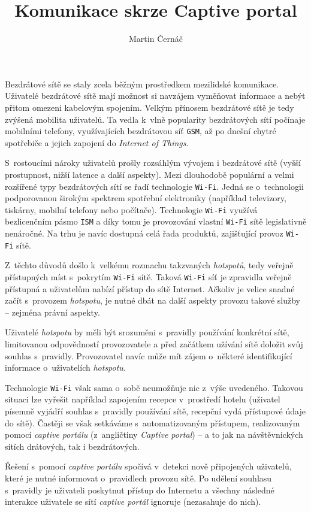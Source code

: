 \documentclass[thesis=M,czech]{FITthesis}[2012/10/20]
\title{Komunikace skrze Captive portal}
\author{Martin Černáč} %
\begin{document}
\begin{introduction}
Bezdrátové sítě se staly zcela běžným prostředkem mezilidské komunikace. Uživatelé bezdrátové sítě mají možnost si navzájem vyměňovat informace a nebýt přitom omezeni kabelovým spojením. Velkým přínosem bezdrátové sítě je tedy zvýšená mobilita uživatelů. Ta vedla k~vlně popularity bezdrátových sítí počínaje mobilními telefony, využívajících bezdrátovou síť \texttt{GSM}, až po dnešní chytré spotřebiče a jejich zapojení do \textit{Internet of Things}.

S~rostoucími nároky uživatelů prošly rozsáhlým vývojem i bezdrátové sítě (vyšší prostupnost, nižší latence a další aspekty). Mezi dlouhodobě populární a velmi rozšířené typy bezdrátových sítí se řadí technologie \texttt{Wi-Fi}. Jedná se o~technologii podporovanou širokým spektrem spotřební elektroniky (například televizory, tiskárny, mobilní telefony nebo počítače). Technologie \texttt{Wi-Fi} využívá bezlicenčním pásmo \texttt{ISM} a díky tomu je provozování vlastní \texttt{Wi-Fi} sítě legislativně nenáročné. Na trhu je navíc dostupná celá řada produktů, zajišťující provoz \texttt{Wi-Fi} sítě.

Z~těchto důvodů došlo k~velkému rozmachu takzvaných \textit{hotspotů}, tedy veřejně přístupných míst s~pokrytím \texttt{Wi-Fi} sítě. Taková \texttt{Wi-Fi} síť je zpravidla veřejně přístupná a uživatelům nabízí přístup do sítě Internet. Ačkoliv je velice snadné začít s~provozem \textit{hotspotu}, je nutné dbát na další aspekty provozu takové služby -- zejména právní aspekty.

Uživatelé \textit{hotspotu} by měli být srozuměni s~pravidly používání konkrétní sítě, limitovanou odpovědností provozovatele a před začátkem užívání sítě doložit svůj souhlas s~pravidly. Provozovatel navíc může mít zájem o~některé identifikující informace o~uživatelích \textit{hotspotu}.

Technologie \texttt{Wi-Fi} však sama o~sobě neumožňuje nic z~výše uvedeného. Takovou situaci lze vyřešit například zapojením recepce v~prostředí hotelu (uživatel písemně vyjádří souhlas s~pravidly používání sítě, recepční vydá přístupové údaje do sítě). Častěji se však setkáváme s~automatizovaným přístupem, realizovaným pomocí \textit{captive portálu} (z~angličtiny \textit{Captive portal}) -- a to jak na návštěvnických sítích drátových, tak i bezdrátových.

Řešení s~pomocí \textit{captive portálu} spočívá v~detekci nově připojených uživatelů, které je nutné informovat o~pravidlech provozu sítě. Po udělení souhlasu s~pravidly je uživateli poskytnut přístup do Internetu a všechny následné interakce uživatele se sítí \textit{captive portál} ignoruje (nezasahuje do nich).


\end{introduction}
\end{document}
